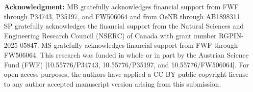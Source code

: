 \documentclass[a4paper]{amsart}
\theoremstyle{definition}
\begin{document}
{\bf Acknowledgment:}
MB gratefully acknowledges financial support from FWF through P34743, P35197, and FW506064 and from OeNB through AB1898311. SP gratefully acknowledges the financial support from the Natural Sciences and Engineering Research Council (NSERC) of Canada with grant number RGPIN-2025-05847. 
MS gratefully acknowledges financial support from FWF through FW506064.
This research was funded in whole or in part by the Austrian Science Fund (FWF) [10.55776/P34743,  10.55776/P35197, and 10.55776/FW506064]. For open access purposes, the authors have applied a CC BY public copyright license to any author accepted manuscript version arising from this submission.


\printbibliography
\end{document}
